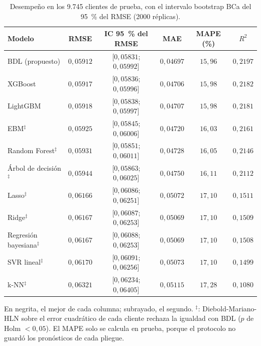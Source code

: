 \begin{table}[tbp]
  \centering\scriptsize\setlength{\tabcolsep}{6pt}
  \caption{Desempeño en los 9.745 clientes de prueba, con el intervalo bootstrap BCa del 95~\% del RMSE (2000 réplicas).}
  \label{tab:prueba}
  \begin{tabular}{lccccc}
    \toprule
    Modelo & RMSE & IC 95~\% del RMSE & MAE & MAPE (\%) & $R^2$ \\
    \midrule
    BDL (propuesto) & {\boldmath\textbf{$0{,}05912$}} & [$0{,}05831$; $0{,}05992$] & {\boldmath\textbf{$0{,}04697$}} & {\boldmath\textbf{$15{,}96$}} & {\boldmath\textbf{$0{,}2197$}} \\
    XGBoost & \underline{$0{,}05917$} & [$0{,}05836$; $0{,}05996$] & \underline{$0{,}04706$} & \underline{$15{,}98$} & \underline{$0{,}2182$} \\
    LightGBM & $0{,}05918$ & [$0{,}05838$; $0{,}05997$] & $0{,}04707$ & \underline{$15{,}98$} & $0{,}2181$ \\
    EBM$^\ddagger$ & $0{,}05925$ & [$0{,}05845$; $0{,}06006$] & $0{,}04720$ & $16{,}03$ & $0{,}2161$ \\
    Random Forest$^\ddagger$ & $0{,}05931$ & [$0{,}05851$; $0{,}06011$] & $0{,}04728$ & $16{,}05$ & $0{,}2146$ \\
    Árbol de decisión$^\ddagger$ & $0{,}05944$ & [$0{,}05863$; $0{,}06025$] & $0{,}04750$ & $16{,}11$ & $0{,}2112$ \\
    Lasso$^\ddagger$ & $0{,}06166$ & [$0{,}06086$; $0{,}06251$] & $0{,}05072$ & $17{,}10$ & $0{,}1511$ \\
    Ridge$^\ddagger$ & $0{,}06167$ & [$0{,}06087$; $0{,}06253$] & $0{,}05069$ & $17{,}10$ & $0{,}1509$ \\
    Regresión bayesiana$^\ddagger$ & $0{,}06167$ & [$0{,}06088$; $0{,}06253$] & $0{,}05069$ & $17{,}10$ & $0{,}1508$ \\
    SVR lineal$^\ddagger$ & $0{,}06170$ & [$0{,}06091$; $0{,}06256$] & $0{,}05073$ & $17{,}10$ & $0{,}1499$ \\
    k-NN$^\ddagger$ & $0{,}06321$ & [$0{,}06234$; $0{,}06405$] & $0{,}05115$ & $17{,}28$ & $0{,}1080$ \\
    \bottomrule
  \end{tabular}
  \par\smallskip\begin{minipage}{0.97\linewidth}\scriptsize En negrita, el mejor de cada columna; subrayado, el segundo. $^\ddagger$: Diebold-Mariano-HLN sobre el error cuadrático de cada cliente rechaza la igualdad con BDL ($p$ de Holm $<0{,}05$). El MAPE solo se calcula en prueba, porque el protocolo no guardó los pronósticos de cada pliegue.\end{minipage}
\end{table}
